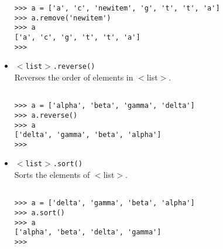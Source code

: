 \begin{itemize}
\begin{lstlisting}
>>> a = ['a', 'c', 'newitem', 'g', 't', 't', 'a']
>>> a.remove('newitem')
>>> a
['a', 'c', 'g', 't', 't', 'a']
>>>
\end{lstlisting}
	\item 
\texttt{$<$list$>$.reverse()}
\\ Reverses the order of     elements in $<$list$>$.      
\begin{lstlisting}

>>> a = ['alpha', 'beta', 'gamma', 'delta']
>>> a.reverse()
>>> a
['delta', 'gamma', 'beta', 'alpha']
>>>
\end{lstlisting}
	\item 
\texttt{$<$list$>$.sort()}
\\ Sorts the elements of     $<$list$>$.      
\begin{lstlisting}

>>> a = ['delta', 'gamma', 'beta', 'alpha']
>>> a.sort()
>>> a
['alpha', 'beta', 'delta', 'gamma']
>>>
\end{lstlisting}
\end{itemize}
% 
% 
% 
% 
% 
% 
% 
% 
% 		
% 
% 		
% 


